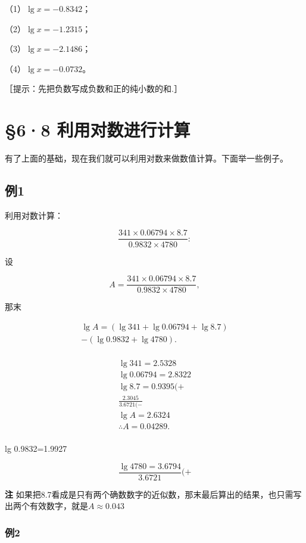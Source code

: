 （1）\(\lg x = -0.8342\)；

（2）\(\lg x = -1.2315\)；

（3）\(\lg x = -2.1486\)；

（4）\(\lg x = -0.0732\)。

［提示：先把负数写成负数和正的纯小数的和.］

\section{§6·8 利用对数进行计算}

有了上面的基础，现在我们就可以利用对数来做数值计算。下面举一些例子。

\subsection{例1}

利用对数计算：

\[
\frac{341 \times 0.06794 \times 8.7}{0.9832 \times 4780}:
\]

 设

\[
A = \frac{341 \times 0.06794 \times 8.7}{0.9832 \times 4780},
\]

那末

\[
\begin{array}{l} \lg A = (\lg 341 + \lg 0.06794 + \lg 8.7) \\ - (\lg 0.9832 + \lg 4780). \\ \end{array}
\]

\[
\begin{array}{l} \lg 341 = 2.5328 \\ \lg 0.06794 = 2.8322 \\ \lg 8.7 = 0.9395 (+ \\ \frac{2.3045}{3.6721 (-} \\ \lg A = 2.6324 \\ \therefore A = 0.04289. \\ \end{array}
\]

lg 0.9832=1.9927

\[
\frac{\lg 4780 = 3.6794}{3.6721} (+ \]

\textbf{注}
如果把8.7看成是只有两个确数数字的近似数，那末最后算出的结果，也只需写出两个有效数字，就是\(A\approx 0.043\)

\subsubsection{例2}

